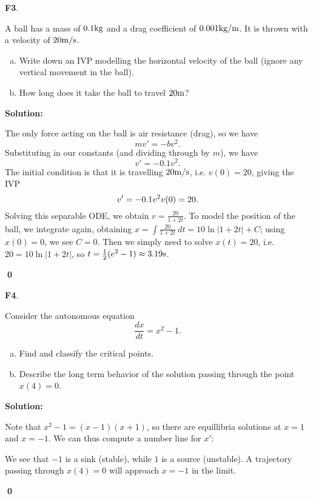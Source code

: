 \documentclass{article}
\newenvironment{problem}[1]
{
  \begin{flushleft}
  \textbf{#1}.
  \ignorespaces
}
{
  \end{flushleft}
}
\newenvironment{solution}
{
  \ignorespaces
  \textbf{Solution:}
}
{
  \ignorespacesafterend
  \begin{flushright}
  {\bfseries \qed}
  \end{flushright}
}
\begin{document}
\begin{problem}{F3}
A ball has a mass of \(0.1 {\rm kg}\) and a drag coefficient of \(0.001 {\rm kg/m}\).  It is thrown with a velocity of \(20 {\rm m/s}\). 
\begin{enumerate}[(a)]
\item Write down an IVP modelling the horizontal velocity of the ball (ignore any vertical movement in the ball).
\item How long does it take the ball to travel \(20 {\rm m}\)?
\end{enumerate}
\end{problem}
\begin{solution}
The only force acting on the ball is air resistance (drag), so we have
\[mv'=-bv^2.\]
Substituting in our constants (and dividing through by \(m\)), we have
\[v'=- 0.1v^2 .\]
The initial condition is that it is travelling \(20 {\rm m/s}\), i.e. \(v(0)=20\), giving the IVP 
\[v'=- 0.1v^2 \vspace{5em} v(0)=20.\]
Solving this separable ODE, we obtain \(v=\frac{20}{1+2t}\).  To model the position of the ball, we integrate again, obtaining \(x=\int \frac{20}{1+2t}\ dt = 10 \ln |1+2t| +C\); using \(x(0)=0\), we see \(C=0\).  Then we simply need to solve \(x(t)=20\), i.e. \(20=10\ln|1+2t|\), so \(t=\frac{1}{2}(e^2-1) \approx 3.19 {\rm s}\).
\end{solution}



\begin{problem}{F4}
Consider the autonomous equation 
\[\frac{dx}{dt} = x^2-1.\]  
\begin{enumerate}[(a)]
\item Find and classify the critical points.
\item Describe the long term behavior of the solution passing through the point \( x(4)=0 \).
\end{enumerate}
\end{problem}
\begin{solution}

Note that \(x^2-1=(x-1)(x+1)\), so there are equillibria solutions at \(x=1\) and \(x=-1\).  We can thus compute a number line for \(x'\):

\begin{center}
\end{center}

We see that \(-1\) is a sink (stable), while \(1\) is a source (unstable).  A trajectory passing through \(x(4)=0\) will approach \(x=-1\) in the limit.
\end{solution}
\end{document}
